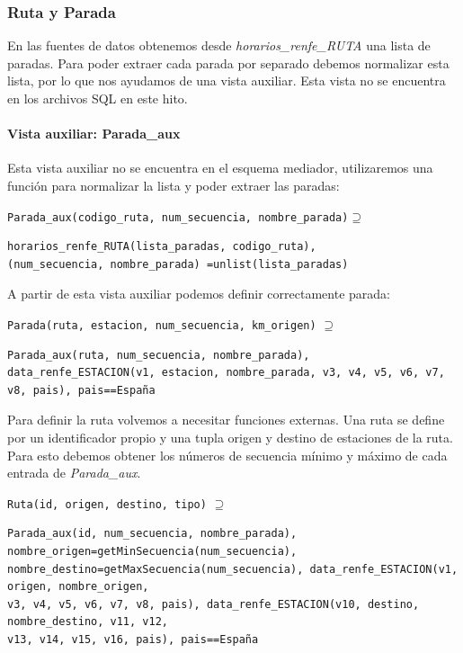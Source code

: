 \subsubsection{Ruta y Parada}\label{ruta-y-parada}

En las fuentes de datos obtenemos desde \emph{horarios\_renfe\_RUTA} una
lista de paradas. Para poder extraer cada parada por separado debemos
normalizar esta lista, por lo que nos ayudamos de una vista auxiliar.
Esta vista no se encuentra en los archivos SQL en este hito.

\paragraph{Vista auxiliar: Parada\_aux}\label{vista-auxiliar-parada_aux}

Esta vista auxiliar no se encuentra en el esquema mediador, utilizaremos
una función para normalizar la lista y poder extraer las paradas:

\texttt{Parada\_aux(codigo\_ruta,\ num\_secuencia,\ nombre\_parada)}\(\supseteq\)

\begin{verbatim}
horarios_renfe_RUTA(lista_paradas, codigo_ruta), 
(num_secuencia, nombre_parada) =unlist(lista_paradas)
\end{verbatim}

A partir de esta vista auxiliar podemos definir correctamente parada:

\texttt{Parada(ruta,\ estacion,\ num\_secuencia,\ km\_origen)}
\(\supseteq\)

\begin{verbatim}
Parada_aux(ruta, num_secuencia, nombre_parada), 
data_renfe_ESTACION(v1, estacion, nombre_parada, v3, v4, v5, v6, v7, v8, pais), pais==España
\end{verbatim}

Para definir la ruta volvemos a necesitar funciones externas. Una ruta
se define por un identificador propio y una tupla origen y destino de
estaciones de la ruta. Para esto debemos obtener los números de
secuencia mínimo y máximo de cada entrada de \emph{Parada\_aux}.

\texttt{Ruta(id,\ origen,\ destino,\ tipo)} \(\supseteq\)

\begin{verbatim}
Parada_aux(id, num_secuencia, nombre_parada), nombre_origen=getMinSecuencia(num_secuencia), 
nombre_destino=getMaxSecuencia(num_secuencia), data_renfe_ESTACION(v1, origen, nombre_origen, 
v3, v4, v5, v6, v7, v8, pais), data_renfe_ESTACION(v10, destino, nombre_destino, v11, v12, 
v13, v14, v15, v16, pais), pais==España
\end{verbatim}

